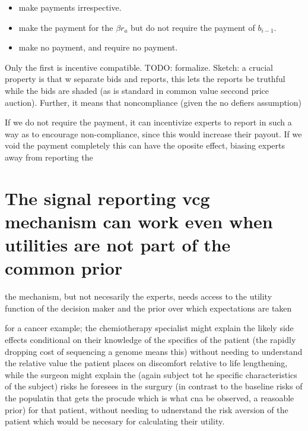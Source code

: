 \begin{itemize}
\item make payments irrespective. 
\item make the payment for the $\beta r_a$ but do not require the payment of $b_{i-1}$.
\item make no payment, and require no payment.
\end{itemize}

Only the first is incentive compatible. TODO: formalize. Sketch: a crucial property is that w separate bids and reports, this lets the reports be truthful while the bids are shaded (as is standard in common value seccond price auction). Further, it means that noncompliance (given the no defiers assumption) 

If we do not require the payment, it can incentivize experts to report in such a way as to encourage non-compliance, since this would increase their payout. 
If we void the payment completely this can have the oposite effect, biasing experts away from reporting the 






\section{The signal reporting vcg mechanism can work even when utilities are not part of the common prior}

the mechanism, but not necesarily the experts, needs access to the utility function of the decision maker and the prior over which expectations are taken 

for a cancer example; the chemiotherapy specialist might explain the likely side effects conditional on their knowledge of the specifics of the patient (the rapidly dropping cost of sequencing a genome means this) without needing to understand the relative value the patient places on discomfort relative to life lengthening, while the surgeon might explain the (again subject tot he specific characteristics of the subject) risks he foresees in the surgury (in contrast to the baseline risks of the populatin that gets the procude which is what cna be observed, a reasoable prior) for that patient, without needing to udnerstand the risk aversion of the patient which would be necesary for calculating their utility.

